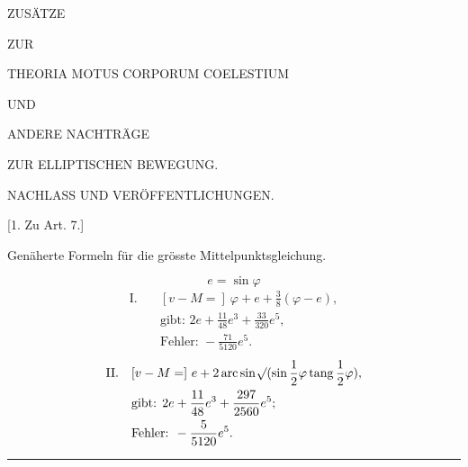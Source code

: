\clearpage
\thispagestyle{empty}
\vspace*{1.6in}
\begin{center}
{\LARGE ZUSÄTZE\par}
\bigskip
{\large ZUR\par}
\bigskip
{\large THEORIA MOTUS CORPORUM COELESTIUM\par}
\bigskip
{\large UND\par}
\bigskip
{\Large ANDERE NACHTRÄGE\par}
\medskip
{\large ZUR ELLIPTISCHEN BEWEGUNG.\par}
\end{center}
\clearpage
{}
\begin{center}
{\large NACHLASS UND VERÖFFENTLICHUNGEN.\par}
\bigskip
{}[1. Zu Art. 7.]
\medskip

Genäherte Formeln für die grösste Mittelpunktsgleichung.
\end{center}
\[
e=\sin\varphi
\]
\[
\begin{aligned}
\mathrm{I.}\quad &[v-M=]\ \varphi+e+\frac{3}{8}(\varphi-e),\\
&\text{gibt: }2e+\frac{11}{48}e^3+\frac{33}{320}e^5,\\
&\text{Fehler: }-\frac{71}{5120}e^5.
\end{aligned}
\]
\[
\begin{aligned}
\mathrm{II.}\quad &[v-M=]\ e+2\operatorname{arc}\sin\BareRoot{(\sin\frac{1}{2}\varphi\operatorname{tang}\frac{1}{2}\varphi)},\\
&\text{gibt: }2e+\frac{11}{48}e^3+\frac{297}{2560}e^5;\\
&\text{Fehler: }-\frac{5}{5120}e^5.
\end{aligned}
\]
\begin{center}\rule{.3\linewidth}{.4pt}\end{center}
